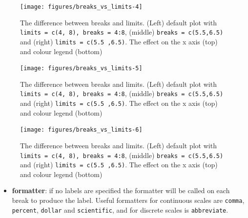 \begin{figure}
\texttt{[image: figures/breaks\_vs\_limits-4]} \caption{The difference between breaks and limits. (Left) default plot with \texttt{limits = c(4, 8), breaks = 4:8}, (middle) \texttt{breaks = c(5.5,6.5)} and (right) \texttt{limits = c(5.5 ,6.5)}. The effect on the x axis (top) and colour legend (bottom)\label{fig:breaks_vs_limits4}}
\end{figure}

\begin{Shaded}
\begin{Highlighting}[]
\StringTok{ }\NormalTok{(} \NormalTok{(}\NormalTok{, }\NormalTok{))}
\end{Highlighting}
\end{Shaded}

\begin{figure}
\texttt{[image: figures/breaks\_vs\_limits-5]} \caption{The difference between breaks and limits. (Left) default plot with \texttt{limits = c(4, 8), breaks = 4:8}, (middle) \texttt{breaks = c(5.5,6.5)} and (right) \texttt{limits = c(5.5 ,6.5)}. The effect on the x axis (top) and colour legend (bottom)\label{fig:breaks_vs_limits5}}
\end{figure}

\begin{Shaded}
\begin{Highlighting}[]
\StringTok{ }\NormalTok{(} \NormalTok{(}\NormalTok{, }\NormalTok{))}
\end{Highlighting}
\end{Shaded}

\begin{figure}
\texttt{[image: figures/breaks\_vs\_limits-6]} \caption{The difference between breaks and limits. (Left) default plot with \texttt{limits = c(4, 8), breaks = 4:8}, (middle) \texttt{breaks = c(5.5,6.5)} and (right) \texttt{limits = c(5.5 ,6.5)}. The effect on the x axis (top) and colour legend (bottom)\label{fig:breaks_vs_limits6}}
\end{figure}

\begin{itemize}
\itemsep1pt\parskip0pt
\item
  \textbf{formatter}: if no labels are specified the formatter will be
  called on each break to produce the label. Useful formatters for
  continuous scales are \texttt{comma}, \texttt{percent},
  \texttt{dollar} and \texttt{scientific}, and for discrete scales is
  \texttt{abbreviate}. 
\end{itemize}

